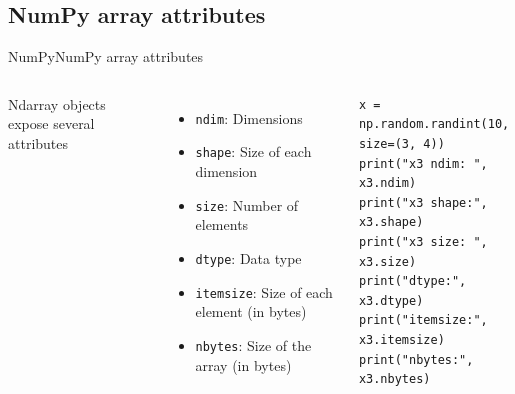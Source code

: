 \documentclass[10pt,compress]{beamer} %
\begin{document}
\subsection{NumPy array attributes}
\begin{frame}[fragile]{NumPy}{NumPy array attributes}
	\begin{columns}
		Ndarray objects expose several attributes
		\begin{itemize}
			\item \texttt{ndim}: Dimensions
			\item \texttt{shape}: Size of each dimension
			\item \texttt{size}: Number of elements
			\item \texttt{dtype}: Data type
			\item \texttt{itemsize}: Size of each element (in bytes)
			\item \texttt{nbytes}: Size of the array (in bytes)
		\end{itemize}

		\begin{exampleblock}{}
		\vspace{-0.2cm} 
			\begin{lstlisting}
x = np.random.randint(10, size=(3, 4))
print("x3 ndim: ", x3.ndim)
print("x3 shape:", x3.shape)
print("x3 size: ", x3.size)
print("dtype:", x3.dtype)
print("itemsize:", x3.itemsize)
print("nbytes:", x3.nbytes)
			\end{lstlisting}
		\vspace{-0.2cm} 
		\end{exampleblock}
	\end{columns}
\end{frame}
\end{document}
